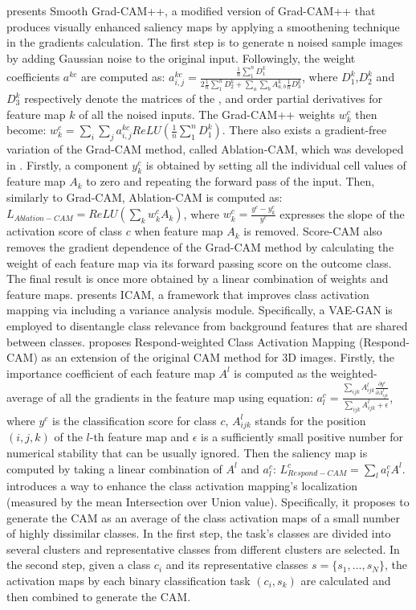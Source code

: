 \documentclass[journal]{IEEEtran}
\begin{document}
\cite{Omeiza2019} presents Smooth Grad-CAM++, a modified version of Grad-CAM++ that produces visually enhanced saliency maps by applying a smoothening technique in the gradients calculation. The first step is to generate n noised sample images by adding Gaussian noise to the original input. Followingly, the weight coefficients $a^{kc}$ are computed as: $a_{i,j}^{kc}=\frac{\frac{1}{n}\sum_1^nD_1^k}{2\frac{1}{n}\sum_1^nD_2^k+\sum_a\sum_bA_{a,b}^k\frac{1}{n}D_3^k}$, where $D_1^k$,$D_2^k$ and $D_3^k$ respectively denote the matrices of the ,  and  order partial derivatives for feature map $k$ of all the noised inputs. The Grad-CAM++ weights $w_k^c$ then become: $w_k^c=\sum_i\sum_ja_{i,j}^{kc}ReLU\left(\frac{1}{n}\sum_1^nD_1^k\right)$. 
There also exists a gradient-free variation of the Grad-CAM method, called Ablation-CAM, which was developed in \cite{Desai2020}. Firstly, a component $y_k^c$ is obtained by setting all the individual cell values of feature map $A_k$ to zero and repeating the forward pass of the input. Then, similarly to Grad-CAM, Ablation-CAM is computed as: $L_{Ablation-CAM}=ReLU\left(\sum_kw_k^cA_k\right)$, where  $w_k^c=\frac{y^c-y_k^c}{y^c}$ expresses the slope of the activation score of class $c$ when feature map $A_k$ is removed. 
\cite{Wang2020} Score-CAM also removes the gradient dependence of the Grad-CAM method by calculating the weight of each feature map via its forward passing score on the outcome class. The final result is once more obtained by a linear combination of weights and feature maps. 
\cite{Bass2020} presents ICAM, a framework that improves class activation mapping via including a variance analysis module. Specifically, a VAE-GAN is employed to disentangle class relevance from background features that are shared between classes.    
\cite{Zhao2018} proposes Respond-weighted Class Activation Mapping (Respond-CAM) as an extension of the original CAM method for 3D images. Firstly, the importance coefficient of each feature map $A^l$ is computed as the weighted-average of all the gradients in the feature map using equation: $a_l^c=\frac{\sum_{ijk}A^l_{ijk}\frac{\partial y^c}{\partial A_{ijk}^l}}{\sum_{ijk}A_{ijk}^l+\epsilon}$, where $y^c$ is the classification score for class $c$,  $A_{ijk}^l$ stands for the position $(i, j, k)$ of the $l$-th feature map and $\epsilon$ is a sufficiently small positive number for numerical stability that can be usually ignored. Then the saliency map is computed by taking a linear combination of $A^l$ and $a_l^c$: $L_{Respond-CAM}^c=\sum_la_l^cA^l$. 
\cite{Meng2019} introduces a way to enhance the class activation mapping's localization (measured by the mean Intersection over Union value). Specifically, it proposes to generate the CAM as an average of the class activation maps of a small number of highly dissimilar classes. In the first step, the task's classes are divided into several clusters and representative classes from different clusters are selected. In the second step, given a class $c_i$ and its representative classes $s=\{s_1,...,s_N\}$, the activation maps by each binary classification task $(c_i,s_k)$ are calculated and then combined to generate the CAM. 
\end{document}
